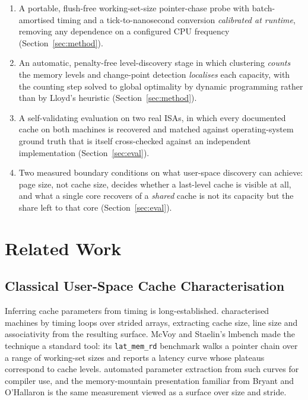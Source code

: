 \documentclass[conference]{IEEEtran}
\begin{document}
\begin{enumerate}
\item A portable, flush-free working-set-size pointer-chase probe with
batch-amortised timing and a tick-to-nanosecond conversion \emph{calibrated at
runtime}, removing any dependence on a configured CPU frequency
(Section~\ref{sec:method}).
\item An automatic, penalty-free level-discovery stage in which clustering
\emph{counts} the memory levels and change-point detection \emph{localises} each
capacity, with the counting step solved to global optimality by dynamic
programming rather than by Lloyd's heuristic (Section~\ref{sec:method}).
\item A self-validating evaluation on two real ISAs, in which every documented
cache on both machines is recovered and matched against operating-system ground
truth that is itself cross-checked against an independent implementation
(Section~\ref{sec:eval}).
\item Two measured boundary conditions on what user-space discovery can achieve:
page size, not cache size, decides whether a last-level cache is visible at all,
and what a single core recovers of a \emph{shared} cache is not its capacity but
the share left to that core (Section~\ref{sec:eval}).
\end{enumerate}

\section{Related Work}
\label{sec:related}

\subsection{Classical User-Space Cache Characterisation}

Inferring cache parameters from timing is long-established. \citet{saavedra1995} characterised machines by timing loops over strided arrays,
extracting cache size, line size and associativity from the resulting surface.
McVoy and Staelin's lmbench \citep{mcvoy1996} made the technique a standard tool:
its \texttt{lat\_mem\_rd} benchmark walks a pointer chain over a range of
working-set sizes and reports a latency curve whose plateaus correspond to cache
levels. \citet{yotov2005} automated parameter extraction from such
curves for compiler use, and the memory-mountain presentation familiar from
Bryant and O'Hallaron \citep{bryant2015} is the same measurement viewed as a
surface over size and stride.
\end{document}

